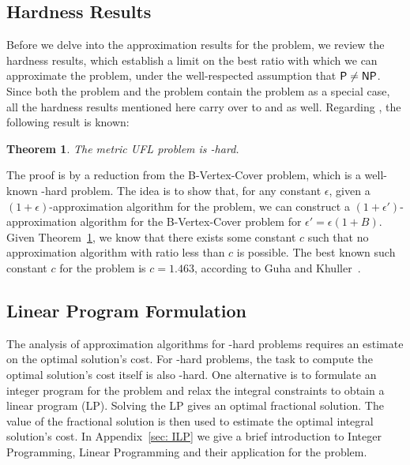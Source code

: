 \documentclass[oneside,final]{ucr}
\newtheorem{theorem}{Theorem}
\begin{document}
\subsection{Hardness Results}
Before we delve into the approximation results for the
{\UFL} problem, we review the hardness results, which
establish a limit on the best ratio with which we can
approximate the {\UFL} problem, under the well-respected
assumption that ${\mbox{\sf P}} \neq {\mbox{\sf NP}}$. Since both the {\FTFL}
problem and the {\FTFP} problem contain the {\UFL} problem
as a special case, all the hardness results mentioned here
carry over to {\FTFL} and {\FTFP} as well. Regarding {\UFL},
the following result is known:
\begin{theorem}\cite{GuhaK98}
  \label{thm:maxsnp}
  The metric UFL problem is \MaxSNP-hard.
\end{theorem}
The proof is by a reduction from the B-Vertex-Cover problem,
which is a well-known \MaxSNP-hard problem. The idea is to
show that, for any constant $\epsilon$, given a
$(1+\epsilon)$-approximation algorithm for the {\UFL}
problem, we can construct a $(1+\epsilon')$-approximation
algorithm for the B-Vertex-Cover problem for $\epsilon' =
\epsilon(1+B)$. Given Theorem~\ref{thm:maxsnp}, we know that
there exists some constant $c$ such that no approximation
algorithm with ratio less than $c$ is possible. The best
known such constant $c$ for the {\UFL} problem is $c=1.463$,
according to Guha and Khuller~\cite{GuhaK98}.

\subsection{Linear Program Formulation}
The analysis of approximation algorithms for \NP-hard
problems requires an estimate on the optimal solution's
cost. For \NP-hard problems, the task to compute the optimal
solution's cost itself is also \NP-hard. One alternative is
to formulate an integer program for the problem and relax
the integral constraints to obtain a linear program
(LP). Solving the LP gives an optimal fractional
solution. The value of the fractional solution is then used
to estimate the optimal integral solution's cost. In
Appendix~\ref{sec: ILP} we give a brief introduction to
Integer Programming, Linear Programming and their
application for the {\UFL} problem.
\end{document}

